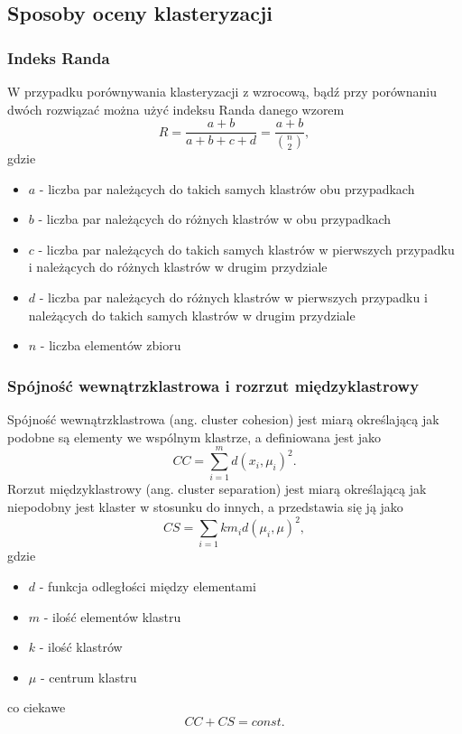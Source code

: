 \subsection{Sposoby oceny klasteryzacji}

\subsubsection{Indeks Randa}
W przypadku porównywania klasteryzacji z wzrocową, bądź przy porównaniu dwóch rozwiązać można użyć indeksu Randa danego wzorem
\begin{equation}
R=\frac{a+b}{a+b+c+d}=\frac{a+b}{\binom{n}{2}},
\end{equation}
gdzie
\begin{itemize}
\item $a$ - liczba par należących do takich samych klastrów obu przypadkach
\item $b$ - liczba par należących do różnych klastrów w obu przypadkach
\item $c$ - liczba par należących do takich samych klastrów w pierwszych przypadku i należących do różnych klastrów w drugim przydziale
\item $d$ - liczba par należących do różnych klastrów w pierwszych przypadku i należących do takich samych klastrów w drugim przydziale
\item $n$ - liczba elementów zbioru
\end{itemize}

\subsubsection{Spójność wewnątrzklastrowa i rozrzut międzyklastrowy}
Spójność wewnątrzklastrowa (ang. cluster cohesion) jest miarą określającą jak podobne są elementy we wspólnym klastrze, a definiowana jest jako
\begin{equation}
CC = \displaystyle \sum_{i=1}^{m} d(x_i, \mu_i)^2.
\end{equation}
Rorzut międzyklastrowy (ang. cluster separation) jest miarą określającą jak niepodobny jest klaster w stosunku do innych, a przedstawia się ją jako
\begin{equation}
CS = \displaystyle \sum_{i=1}{k} m_i d(\mu_i, \mu)^2,
\end{equation}
gdzie
\begin{itemize}
\item $d$ - funkcja odległości między elementami
\item $m$ - ilość elementów klastru
\item $k$ - ilość klastrów
\item $\mu$ - centrum klastru
\end{itemize}
co ciekawe
\begin{equation}
CC + CS = const.
\end{equation}

